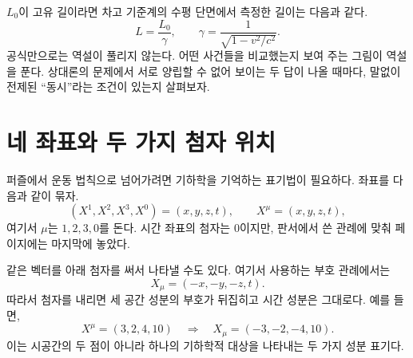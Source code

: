 \begin{classroomqa}
\end{classroomqa}

\(L_0\)이 고유 길이라면 차고 기준계의 수평 단면에서 측정한 길이는 다음과 같다.
\begin{equation}
L=\frac{L_0}{\gamma},
\qquad
\gamma=\frac{1}{\sqrt{1-v^2/c^2}}.
\end{equation}
공식만으로는 역설이 풀리지 않는다. 어떤 사건들을 비교했는지 보여 주는 그림이 역설을 푼다. 상대론의 문제에서 서로 양립할 수 없어 보이는 두 답이 나올 때마다, 말없이 전제된 ``동시''라는 조건이 있는지 살펴보자.

\section{네 좌표와 두 가지 첨자 위치}

퍼즐에서 운동 법칙으로 넘어가려면 기하학을 기억하는 표기법이 필요하다. 좌표를 다음과 같이 묶자.
\begin{equation}
(X^1,X^2,X^3,X^0)=(x,y,z,t),
\qquad X^\mu=(x,y,z,t),
\end{equation}
여기서 \(\mu\)는 \(1,2,3,0\)를 돈다. 시간 좌표의 첨자는 \(0\)이지만, 판서에서 쓴 관례에 맞춰 페이지에는 마지막에 놓았다.

\begin{classroomqa}
\end{classroomqa}

같은 벡터를 아래 첨자를 써서 나타낼 수도 있다. 여기서 사용하는 부호 관례에서는
\begin{equation}
X_\mu=(-x,-y,-z,t).
\end{equation}
따라서 첨자를 내리면 세 공간 성분의 부호가 뒤집히고 시간 성분은 그대로다. 예를 들면,
\begin{equation}
X^\mu=(3,2,4,10)
\quad\Longrightarrow\quad
X_\mu=(-3,-2,-4,10).
\end{equation}
이는 시공간의 두 점이 아니라 하나의 기하학적 대상을 나타내는 두 가지 성분 표기다.

